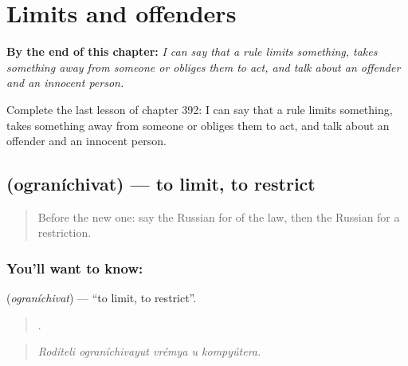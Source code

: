 
\chapter{Limits and offenders}
\label{ch:ru-limits-and-offenders}

\begin{chapteropening}
\textbf{By the end of this chapter:} \emph{I can say that a rule limits something, takes something away from someone or obliges them to act, and talk about an offender and an innocent person.}

Complete the last lesson of chapter 392: I can say that a rule limits something, takes something away from someone or obliges them to act, and talk about an offender and an innocent person.
\end{chapteropening}

\section[\texorpdfstring{\ru{ограничивать} (ograníchivat)}{ограничивать (ograníchivat)}]{ (ograníchivat) — to limit, to restrict}

\label{lesson:RU-C392-ogranichivat}



\begin{quote}
Before the new one: say the Russian for of the law, then the Russian for a restriction.
\end{quote}

\subsection*{You'll want to know: }
\textbf{} (\emph{ograníchivat}) — \textquotedblleft{}to limit, to restrict\textquotedblright{}.

\begin{quote}
    .
\end{quote}

\begin{quote}
\emph{Rodíteli ograníchivayut vrémya u kompyútera.}
\end{quote}

